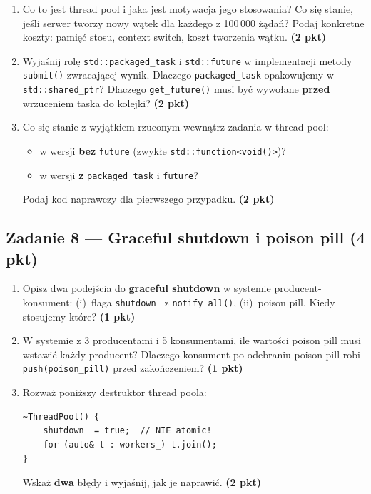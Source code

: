 \documentclass[11pt,a4paper]{article}
\newcommand{\pkt}[1]{\hfill\textbf{(#1 pkt)}}
\begin{document}
\begin{enumerate}[label=(\alph*)]
\item Co to jest thread pool i jaka jest motywacja jego stosowania? Co się stanie, jeśli serwer tworzy nowy wątek dla każdego z 100\,000 żądań? Podaj konkretne koszty: pamięć stosu, context switch, koszt tworzenia wątku. \pkt{2}

\item Wyjaśnij rolę \texttt{std::packaged\_task} i \texttt{std::future} w implementacji metody \texttt{submit()} zwracającej wynik. Dlaczego \texttt{packaged\_task} opakowujemy w \texttt{std::shared\_ptr}? Dlaczego \texttt{get\_future()} musi być wywołane \textbf{przed} wrzuceniem taska do kolejki? \pkt{2}

\item Co się stanie z wyjątkiem rzuconym wewnątrz zadania w thread pool:
\begin{itemize}
\item w wersji \textbf{bez} \texttt{future} (zwykłe \texttt{std::function<void()>})?
\item w wersji \textbf{z} \texttt{packaged\_task} i \texttt{future}?
\end{itemize}
Podaj kod naprawczy dla pierwszego przypadku. \pkt{2}
\end{enumerate}

\subsection*{Zadanie 8 --- Graceful shutdown i poison pill \pkt{4}}

\begin{enumerate}[label=(\alph*)]
\item Opisz dwa podejścia do \textbf{graceful shutdown} w systemie producent-konsument: (i)~flaga \texttt{shutdown\_} z \texttt{notify\_all()}, (ii)~poison pill. Kiedy stosujemy które? \pkt{1}

\item W systemie z 3 producentami i 5 konsumentami, ile wartości poison pill musi wstawić każdy producent? Dlaczego konsument po odebraniu poison pill robi \texttt{push(poison\_pill)} przed zakończeniem? \pkt{1}

\item Rozważ poniższy destruktor thread poola:
\begin{lstlisting}
~ThreadPool() {
    shutdown_ = true;  // NIE atomic!
    for (auto& t : workers_) t.join();
}
\end{lstlisting}
Wskaż \textbf{dwa} błędy i wyjaśnij, jak je naprawić. \pkt{2}
\end{enumerate}
\end{document}
